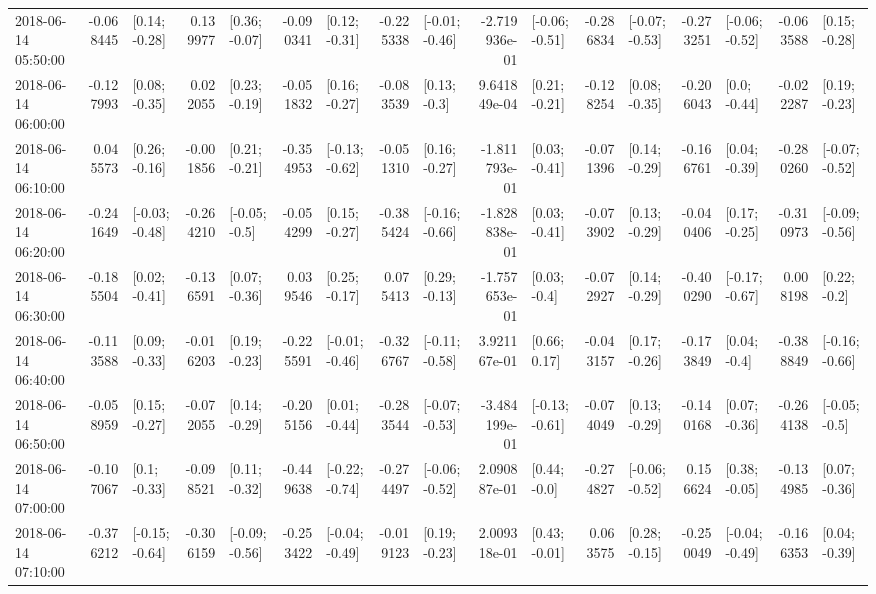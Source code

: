 \begin{tabular}{lrlrlrlrlrlrlrlrl}
2018-06-14 05:50:00 & -0.068445 &   [0.14; -0.28] &  0.139977 &   [0.36; -0.07] & -0.090341 &   [0.12; -0.31] & -0.225338 &  [-0.01; -0.46] & -2.719936e-01 &  [-0.06; -0.51] & -0.286834 &  [-0.07; -0.53] & -0.273251 &  [-0.06; -0.52] & -0.063588 &   [0.15; -0.28] \\
2018-06-14 06:00:00 & -0.127993 &   [0.08; -0.35] &  0.022055 &   [0.23; -0.19] & -0.051832 &   [0.16; -0.27] & -0.083539 &    [0.13; -0.3] &  9.641849e-04 &   [0.21; -0.21] & -0.128254 &   [0.08; -0.35] & -0.206043 &    [0.0; -0.44] & -0.022287 &   [0.19; -0.23] \\
2018-06-14 06:10:00 &  0.045573 &   [0.26; -0.16] & -0.001856 &   [0.21; -0.21] & -0.354953 &  [-0.13; -0.62] & -0.051310 &   [0.16; -0.27] & -1.811793e-01 &   [0.03; -0.41] & -0.071396 &   [0.14; -0.29] & -0.166761 &   [0.04; -0.39] & -0.280260 &  [-0.07; -0.52] \\
2018-06-14 06:20:00 & -0.241649 &  [-0.03; -0.48] & -0.264210 &   [-0.05; -0.5] & -0.054299 &   [0.15; -0.27] & -0.385424 &  [-0.16; -0.66] & -1.828838e-01 &   [0.03; -0.41] & -0.073902 &   [0.13; -0.29] & -0.040406 &   [0.17; -0.25] & -0.310973 &  [-0.09; -0.56] \\
2018-06-14 06:30:00 & -0.185504 &   [0.02; -0.41] & -0.136591 &   [0.07; -0.36] &  0.039546 &   [0.25; -0.17] &  0.075413 &   [0.29; -0.13] & -1.757653e-01 &    [0.03; -0.4] & -0.072927 &   [0.14; -0.29] & -0.400290 &  [-0.17; -0.67] &  0.008198 &    [0.22; -0.2] \\
2018-06-14 06:40:00 & -0.113588 &   [0.09; -0.33] & -0.016203 &   [0.19; -0.23] & -0.225591 &  [-0.01; -0.46] & -0.326767 &  [-0.11; -0.58] &  3.921167e-01 &    [0.66; 0.17] & -0.043157 &   [0.17; -0.26] & -0.173849 &    [0.04; -0.4] & -0.388849 &  [-0.16; -0.66] \\
2018-06-14 06:50:00 & -0.058959 &   [0.15; -0.27] & -0.072055 &   [0.14; -0.29] & -0.205156 &   [0.01; -0.44] & -0.283544 &  [-0.07; -0.53] & -3.484199e-01 &  [-0.13; -0.61] & -0.074049 &   [0.13; -0.29] & -0.140168 &   [0.07; -0.36] & -0.264138 &   [-0.05; -0.5] \\
2018-06-14 07:00:00 & -0.107067 &    [0.1; -0.33] & -0.098521 &   [0.11; -0.32] & -0.449638 &  [-0.22; -0.74] & -0.274497 &  [-0.06; -0.52] &  2.090887e-01 &    [0.44; -0.0] & -0.274827 &  [-0.06; -0.52] &  0.156624 &   [0.38; -0.05] & -0.134985 &   [0.07; -0.36] \\
2018-06-14 07:10:00 & -0.376212 &  [-0.15; -0.64] & -0.306159 &  [-0.09; -0.56] & -0.253422 &  [-0.04; -0.49] & -0.019123 &   [0.19; -0.23] &  2.009318e-01 &   [0.43; -0.01] &  0.063575 &   [0.28; -0.15] & -0.250049 &  [-0.04; -0.49] & -0.166353 &   [0.04; -0.39] \\

\end{tabular}
